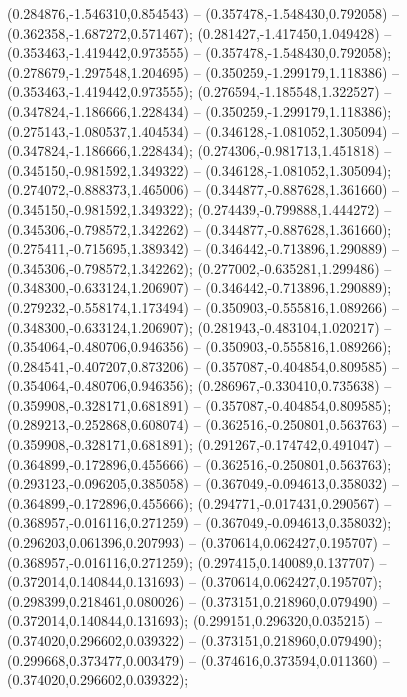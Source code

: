  (0.284876,-1.546310,0.854543) -- (0.357478,-1.548430,0.792058) -- (0.362358,-1.687272,0.571467);
 (0.281427,-1.417450,1.049428) -- (0.353463,-1.419442,0.973555) -- (0.357478,-1.548430,0.792058);
 (0.278679,-1.297548,1.204695) -- (0.350259,-1.299179,1.118386) -- (0.353463,-1.419442,0.973555);
 (0.276594,-1.185548,1.322527) -- (0.347824,-1.186666,1.228434) -- (0.350259,-1.299179,1.118386);
 (0.275143,-1.080537,1.404534) -- (0.346128,-1.081052,1.305094) -- (0.347824,-1.186666,1.228434);
 (0.274306,-0.981713,1.451818) -- (0.345150,-0.981592,1.349322) -- (0.346128,-1.081052,1.305094);
 (0.274072,-0.888373,1.465006) -- (0.344877,-0.887628,1.361660) -- (0.345150,-0.981592,1.349322);
 (0.274439,-0.799888,1.444272) -- (0.345306,-0.798572,1.342262) -- (0.344877,-0.887628,1.361660);
 (0.275411,-0.715695,1.389342) -- (0.346442,-0.713896,1.290889) -- (0.345306,-0.798572,1.342262);
 (0.277002,-0.635281,1.299486) -- (0.348300,-0.633124,1.206907) -- (0.346442,-0.713896,1.290889);
 (0.279232,-0.558174,1.173494) -- (0.350903,-0.555816,1.089266) -- (0.348300,-0.633124,1.206907);
 (0.281943,-0.483104,1.020217) -- (0.354064,-0.480706,0.946356) -- (0.350903,-0.555816,1.089266);
 (0.284541,-0.407207,0.873206) -- (0.357087,-0.404854,0.809585) -- (0.354064,-0.480706,0.946356);
 (0.286967,-0.330410,0.735638) -- (0.359908,-0.328171,0.681891) -- (0.357087,-0.404854,0.809585);
 (0.289213,-0.252868,0.608074) -- (0.362516,-0.250801,0.563763) -- (0.359908,-0.328171,0.681891);
 (0.291267,-0.174742,0.491047) -- (0.364899,-0.172896,0.455666) -- (0.362516,-0.250801,0.563763);
 (0.293123,-0.096205,0.385058) -- (0.367049,-0.094613,0.358032) -- (0.364899,-0.172896,0.455666);
 (0.294771,-0.017431,0.290567) -- (0.368957,-0.016116,0.271259) -- (0.367049,-0.094613,0.358032);
 (0.296203,0.061396,0.207993) -- (0.370614,0.062427,0.195707) -- (0.368957,-0.016116,0.271259);
 (0.297415,0.140089,0.137707) -- (0.372014,0.140844,0.131693) -- (0.370614,0.062427,0.195707);
 (0.298399,0.218461,0.080026) -- (0.373151,0.218960,0.079490) -- (0.372014,0.140844,0.131693);
 (0.299151,0.296320,0.035215) -- (0.374020,0.296602,0.039322) -- (0.373151,0.218960,0.079490);
 (0.299668,0.373477,0.003479) -- (0.374616,0.373594,0.011360) -- (0.374020,0.296602,0.039322);
